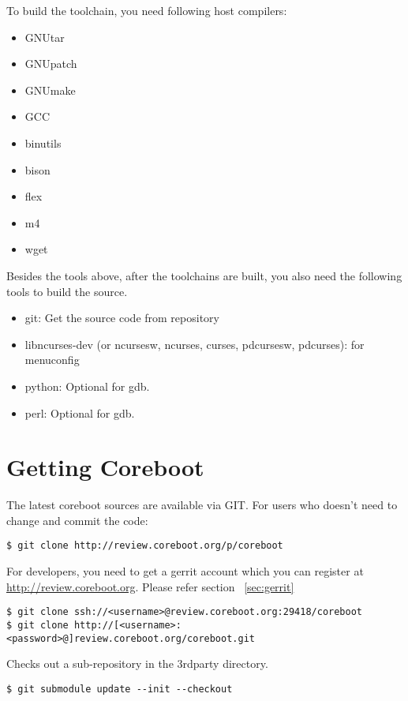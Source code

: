\documentclass[titlepage,12pt]{article}
\begin{document}
To build the toolchain, you need following host compilers:

 \begin{itemize}
 \item GNUtar
 \item GNUpatch
 \item GNUmake
 \item GCC
 \item binutils
 \item bison
 \item flex
 \item m4
 \item wget
 \end{itemize}

Besides the tools above, after the toolchains are built, you also need the following
tools to build the source.

 \begin{itemize}
 \item git: Get the source code from repository
 \item libncurses-dev (or ncursesw, ncurses, curses, pdcursesw, pdcurses): for menuconfig
 \item python: Optional for gdb.
 \item perl: Optional for gdb.
 \end{itemize}

%
%

\section{Getting Coreboot}
The latest coreboot sources are available via GIT.
For users who doesn't need to change and commit the code:
{ \small
\begin{verbatim}
$ git clone http://review.coreboot.org/p/coreboot
\end{verbatim}
}
For developers, you need to get a gerrit account which you can register
at \url{http://review.coreboot.org}. Please refer section ~\ref{sec:gerrit}
{ \small
\begin{verbatim}
$ git clone ssh://<username>@review.coreboot.org:29418/coreboot
$ git clone http://[<username>:<password>@]review.coreboot.org/coreboot.git
\end{verbatim}
}

Checks out a sub-repository in the 3rdparty directory.
{ \small
\begin{verbatim}
$ git submodule update --init --checkout
\end{verbatim}
}
\end{document}
